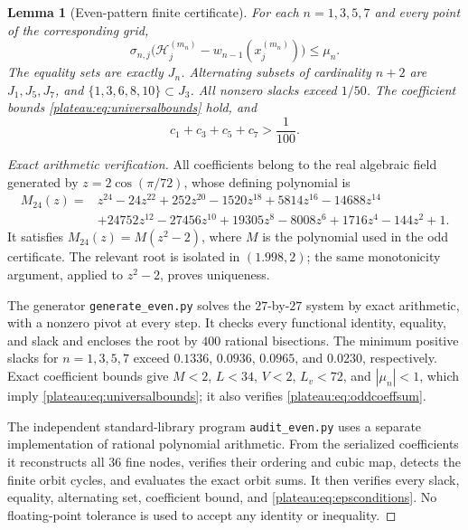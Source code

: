 \documentclass[11pt]{article}
\newtheorem{lemma}[theorem]{Lemma}
\theoremstyle{remark}\newtheorem{remark}[theorem]{Remark}
\begin{document}
\begin{lemma}[Even-pattern finite certificate]\label{plateau:lem:evencertificate}
For each $n=1,3,5,7$ and every point of the corresponding grid,
\[
 \sigma_{n,j}\bigl(\mathcal H_j^{(m_n)}-w_{n-1}(x_j^{(m_n)})\bigr)
 \le\mu_n.
\]
The equality sets are exactly $J_n$. Alternating subsets of cardinality
$n+2$ are $J_1,J_5,J_7$, and
$\{1,3,6,8,10\}\subset J_3$. All nonzero slacks exceed $1/50$.
The coefficient bounds \eqref{plateau:eq:universalbounds} hold, and
\begin{equation}\label{plateau:eq:oddcoeffsum}
 c_1+c_3+c_5+c_7>\frac1{100}.
\end{equation}
\end{lemma}
\begin{proof}[Exact arithmetic verification]
All coefficients belong to the real algebraic field generated by
$z=2\cos(\pi/72)$, whose defining polynomial is
\begin{align*}
 M_{24}(z)={}&z^{24}-24z^{22}+252z^{20}-1520z^{18}+5814z^{16}
 -14688z^{14}\\
 &+24752z^{12}-27456z^{10}+19305z^8-8008z^6
 +1716z^4-144z^2+1.
\end{align*}
It satisfies $M_{24}(z)=M(z^2-2)$, where $M$ is the polynomial used in
the odd certificate. The relevant root is isolated in $(1.998,2)$;
the same monotonicity argument, applied to $z^2-2$, proves uniqueness.

The generator \texttt{generate\_even.py} solves the $27$-by-$27$ system
by exact arithmetic, with a nonzero pivot at every step. It checks every
functional identity, equality, and slack and encloses the root by $400$
rational bisections. The minimum positive slacks for $n=1,3,5,7$ exceed
$0.1336$, $0.0936$, $0.0965$, and $0.0230$, respectively. Exact coefficient
bounds give $M<2$, $L<34$, $V<2$, $L_v<72$, and $|\mu_n|<1$,
which imply \eqref{plateau:eq:universalbounds}; it also verifies
\eqref{plateau:eq:oddcoeffsum}.

The independent standard-library program \texttt{audit\_even.py} uses a
separate implementation of rational polynomial arithmetic. From the
serialized coefficients it reconstructs all $36$ fine nodes, verifies
their ordering and cubic map, detects the finite orbit cycles, and
evaluates the exact orbit sums. It then verifies every slack, equality,
alternating set, coefficient bound, and \eqref{plateau:eq:epsconditions}. No
floating-point tolerance is used to accept any identity or inequality.
\end{proof}
\end{document}
